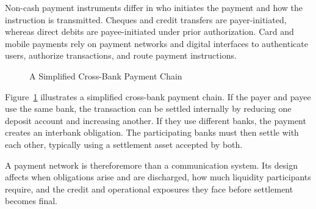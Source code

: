 Non-cash payment instruments differ in who initiates the payment and how the instruction is transmitted. Cheques and credit transfers are payer-initiated, whereas direct debits are payee-initiated under prior authorization. Card and mobile payments rely on payment networks and digital interfaces to authenticate users, authorize transactions, and route payment instructions. 

\begin{figure}[H]
\centering


\caption{A Simplified Cross-Bank Payment Chain}
\label{fig:ch2-payment-chain}
\end{figure}

Figure~\ref{fig:ch2-payment-chain} illustrates a simplified cross-bank payment chain. If the payer and payee use the same bank, the transaction can be settled internally by reducing one deposit account and increasing another. If they use different banks, the payment creates an interbank obligation. The participating banks must then settle with each other, typically using a settlement asset accepted by both.

A payment network is thereforemore than a communication system. Its design affects when obligations arise and are discharged, how much liquidity participants require, and the credit and operational exposures they face before settlement becomes final.

